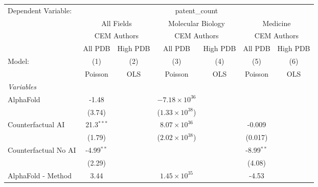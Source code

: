 \begingroup
\centering
\begin{tabular}{lcccccc}
   \tabularnewline \midrule \midrule
   Dependent Variable: & \multicolumn{6}{c}{patent\_count}\\
 & \multicolumn{2}{c}{All Fields} & \multicolumn{2}{c}{Molecular Biology} & \multicolumn{2}{c}{Medicine} \\
\cmidrule(lr){2-3} \cmidrule(lr){4-5} \cmidrule(lr){6-7}
 & \multicolumn{2}{c}{CEM Authors} & \multicolumn{2}{c}{CEM Authors} & \multicolumn{2}{c}{CEM Authors} \\
\cmidrule(lr){2-3} \cmidrule(lr){4-5} \cmidrule(lr){6-7}
 & \multicolumn{1}{c}{All PDB} & \multicolumn{1}{c}{High PDB} & \multicolumn{1}{c}{All PDB} & \multicolumn{1}{c}{High PDB} & \multicolumn{1}{c}{All PDB} & \multicolumn{1}{c}{High PDB} \\
\cmidrule(lr){2-2} \cmidrule(lr){3-3} \cmidrule(lr){4-4} \cmidrule(lr){5-5} \cmidrule(lr){6-6} \cmidrule(lr){7-7}
   Model:                                                     & (1)           & (2)  & (3)                     & (4)  & (5)          & (6)\\  
                                                              &  Poisson      & OLS  & Poisson                 & OLS  & Poisson      & OLS\\  
   \midrule
   \emph{Variables}\\
   AlphaFold                                                  & -1.48         &      & $-7.18\times 10^{36}$   &      &              &   \\   
                                                              & (3.74)        &      & ($1.33\times 10^{38}$)  &      &              &   \\   
   Counterfactual AI                                          & 21.3$^{***}$  &      & $8.07\times 10^{36}$    &      & -0.009       &   \\   
                                                              & (1.79)        &      & ($2.02\times 10^{38}$)  &      & (0.017)      &   \\   
   Counterfactual No AI                                       & -4.99$^{**}$  &      &                         &      & -8.99$^{**}$ &   \\   
                                                              & (2.29)        &      &                         &      & (4.08)       &   \\   
   AlphaFold - Method                                         & 3.44          &      & $1.45\times 10^{35}$    &      & -4.53        &   \\   

\end{tabular}

